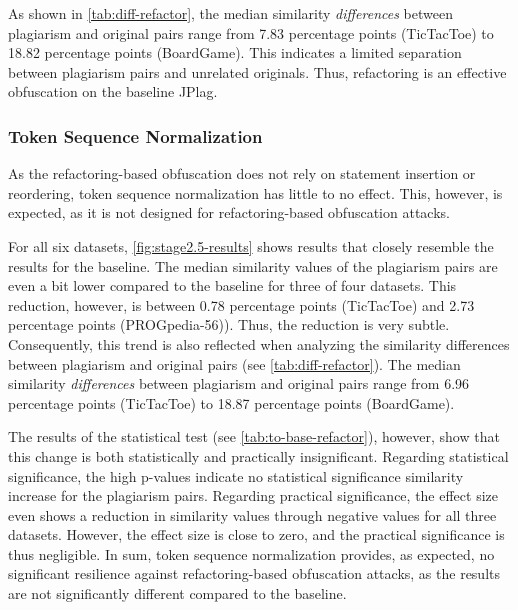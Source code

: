 As shown in \autoref{tab:diff-refactor}, the median similarity \textit{differences} between plagiarism and original pairs range from 7.83 percentage points (TicTacToe) to 18.82 percentage points (BoardGame). This indicates a limited separation between plagiarism pairs and unrelated originals. Thus, refactoring is an effective obfuscation on the baseline JPlag.

\subsubsection{Token Sequence Normalization}
As the refactoring-based obfuscation does not rely on statement insertion or reordering, token sequence normalization has little to no effect. This, however, is expected, as it is not designed for refactoring-based obfuscation attacks.

For all six datasets, \autoref{fig:stage2.5-results} shows results that closely resemble the results for the baseline.
The median similarity values of the plagiarism pairs are even a bit lower compared to the baseline for three of four datasets. This reduction, however, is between 0.78 percentage points (TicTacToe) and 2.73 percentage points (PROGpedia-56)). Thus, the reduction is very subtle.
Consequently, this trend is also reflected when analyzing the similarity differences between plagiarism and original pairs (see \autoref{tab:diff-refactor}).
The median similarity \textit{differences} between plagiarism and original pairs range from 6.96 percentage points (TicTacToe) to 18.87 percentage points (BoardGame).

The results of the statistical test (see \autoref{tab:to-base-refactor}), however, show that this change is both statistically and practically insignificant.
Regarding statistical significance, the high p-values indicate no statistical significance similarity increase for the plagiarism pairs.
Regarding practical significance, the effect size even shows a reduction in similarity values through negative values for all three datasets. However, the effect size is close to zero, and the practical significance is thus negligible.
In sum, token sequence normalization provides, as expected, no significant resilience against refactoring-based obfuscation attacks, as the results are not significantly different compared to the baseline.


